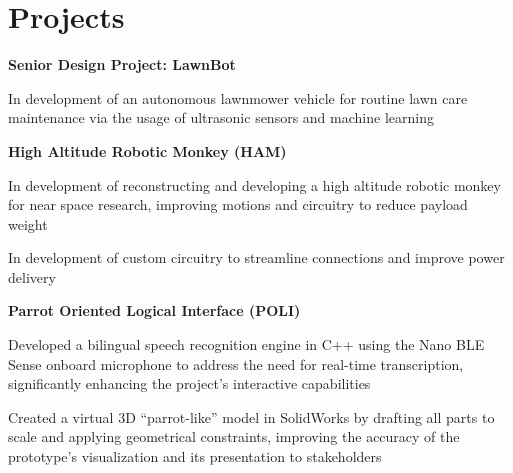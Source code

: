 \section{Projects}

	\begin{twocolentry}{}
        \textbf{Senior Design Project: LawnBot}
    \end{twocolentry}

    \vspace{0.10 cm}
    \begin{onecolentry}
        \begin{highlights}
            \item In development of an autonomous lawnmower vehicle for routine lawn care maintenance via the usage of ultrasonic sensors and machine learning
        \end{highlights}
    \end{onecolentry}
    
    \vspace{0.2 cm}

    \begin{twocolentry}{}
    	\textbf{High Altitude Robotic Monkey (HAM)}
	\end{twocolentry}

    \vspace{0.10 cm}
    \begin{onecolentry}
        \begin{highlights}
            \item In development of reconstructing and developing a high altitude robotic monkey for near space research, improving motions and circuitry to reduce payload weight
            \item In development of custom circuitry to streamline connections and improve power delivery
        \end{highlights}
    \end{onecolentry}

    \vspace{0.2 cm}
    
    \begin{twocolentry}{}
        \textbf{Parrot Oriented Logical Interface (POLI)}
    \end{twocolentry}

    \vspace{0.10 cm}
    \begin{onecolentry}
        \begin{highlights}
            \item Developed a bilingual speech recognition engine in C++ using the Nano BLE Sense onboard microphone to address the need for real-time transcription, significantly enhancing the project’s interactive capabilities
            \item Created a virtual 3D “parrot-like” model in SolidWorks by drafting all parts to scale and applying geometrical constraints, improving the accuracy of the prototype’s visualization and its presentation to stakeholders
        \end{highlights}
    \end{onecolentry}